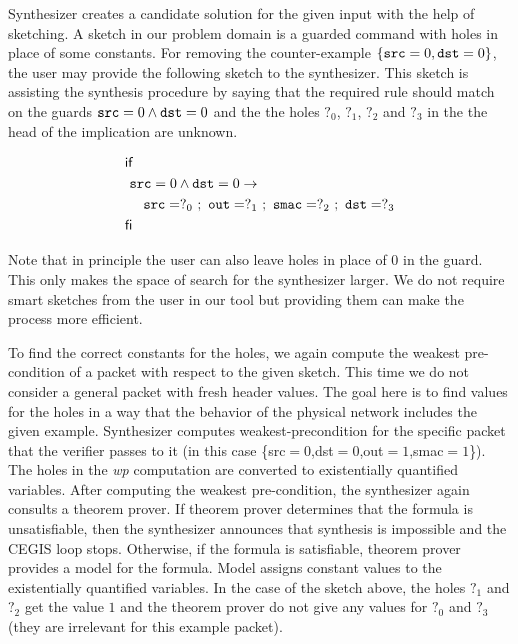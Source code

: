 

Synthesizer creates a candidate solution for the given input with the help of sketching.
A sketch in our problem domain is a guarded command with holes in place of some constants.
For removing the counter-example $\{\mbox{\ttfamily src}=0,\mbox{\ttfamily dst}=0\}$, 
the user may provide the following sketch to the synthesizer.
This sketch is assisting the synthesis procedure by saying that 
the required rule should match on the guards $\mbox{\ttfamily src}=0\wedge\mbox{\ttfamily dst}=0$
and the the holes $?_0$, $?_1$, $?_2$ and $?_3$ in the the head of the implication 
are unknown.

\[
\begin{aligned}
 &\mathsf{if} \\
 &~\mbox{\ttfamily src}=0\wedge\mbox{\ttfamily dst}=0 \to \\
 &~~~~\mbox{\ttfamily src}=?_0~;~\mbox{\ttfamily out}=?_1~;~\mbox{\ttfamily smac}=?_2~;~\mbox{\ttfamily dst}=?_3 \\
 &\mathsf{fi}
\end{aligned}
\]

Note that in principle the user can also leave holes in place of $0$ in the guard.
This only makes the space of search for the synthesizer larger.
We do not require smart sketches from the user in our tool but providing them can 
make the process more efficient.


To find the correct constants for the holes, we again compute the weakest pre-condition
of a packet with respect to the given sketch.
This time we do not consider a general packet with fresh header values.
The goal here is to find values for the holes in a way that the behavior of 
the physical network includes the given example.
Synthesizer computes weakest-precondition for the specific packet that 
the verifier passes to it (in this case 
\{\mbox{\ttfamily src$=0$},\mbox{\ttfamily dst$=0$},\mbox{\ttfamily out$=1$},\mbox{\ttfamily smac$=1$}\}).
The holes in the {\it wp} computation are converted to existentially quantified variables.
After computing the weakest pre-condition, the synthesizer again consults a theorem prover.
If theorem prover determines that the formula is unsatisfiable, 
then the synthesizer announces that synthesis is impossible and the CEGIS loop stops.
Otherwise, if the formula is satisfiable, theorem prover provides a model for the formula.
Model assigns constant values to the existentially quantified variables.
In the case of the sketch above, the holes $?_1$ and $?_2$ get the value $1$ and the theorem prover
do not give any values for $?_0$ and $?_3$  (they are irrelevant for this example packet).

